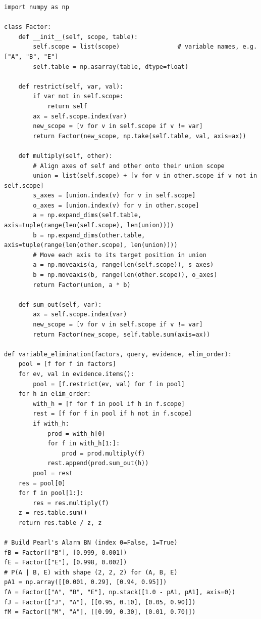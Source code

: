 \begin{lstlisting}[caption={通用离散贝叶斯网络变量消元（VE）引擎与暴力枚举精确核验},label={lst:ve}]
import numpy as np

class Factor:
    def __init__(self, scope, table):
        self.scope = list(scope)                # variable names, e.g. ["A", "B", "E"]
        self.table = np.asarray(table, dtype=float)

    def restrict(self, var, val):
        if var not in self.scope:
            return self
        ax = self.scope.index(var)
        new_scope = [v for v in self.scope if v != var]
        return Factor(new_scope, np.take(self.table, val, axis=ax))

    def multiply(self, other):
        # Align axes of self and other onto their union scope
        union = list(self.scope) + [v for v in other.scope if v not in self.scope]
        s_axes = [union.index(v) for v in self.scope]
        o_axes = [union.index(v) for v in other.scope]
        a = np.expand_dims(self.table, axis=tuple(range(len(self.scope), len(union))))
        b = np.expand_dims(other.table, axis=tuple(range(len(other.scope), len(union))))
        # Move each axis to its target position in union
        a = np.moveaxis(a, range(len(self.scope)), s_axes)
        b = np.moveaxis(b, range(len(other.scope)), o_axes)
        return Factor(union, a * b)

    def sum_out(self, var):
        ax = self.scope.index(var)
        new_scope = [v for v in self.scope if v != var]
        return Factor(new_scope, self.table.sum(axis=ax))

def variable_elimination(factors, query, evidence, elim_order):
    pool = [f for f in factors]
    for ev, val in evidence.items():
        pool = [f.restrict(ev, val) for f in pool]
    for h in elim_order:
        with_h = [f for f in pool if h in f.scope]
        rest = [f for f in pool if h not in f.scope]
        if with_h:
            prod = with_h[0]
            for f in with_h[1:]:
                prod = prod.multiply(f)
            rest.append(prod.sum_out(h))
        pool = rest
    res = pool[0]
    for f in pool[1:]:
        res = res.multiply(f)
    z = res.table.sum()
    return res.table / z, z

# Build Pearl's Alarm BN (index 0=False, 1=True)
fB = Factor(["B"], [0.999, 0.001])
fE = Factor(["E"], [0.998, 0.002])
# P(A | B, E) with shape (2, 2, 2) for (A, B, E)
pA1 = np.array([[0.001, 0.29], [0.94, 0.95]])
fA = Factor(["A", "B", "E"], np.stack([1.0 - pA1, pA1], axis=0))
fJ = Factor(["J", "A"], [[0.95, 0.10], [0.05, 0.90]])
fM = Factor(["M", "A"], [[0.99, 0.30], [0.01, 0.70]])


\end{lstlisting}
